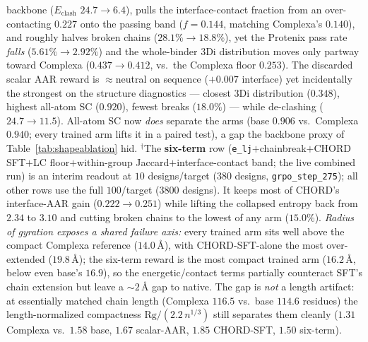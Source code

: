 \documentclass[11pt]{article}
\newcommand{\ttk}[1]{\texttt{\small #1}}
\begin{document}
\begin{table}[htbp]
{backbone ($E_{\mathrm{clash}}$ $24.7\!\to\!6.4$), pulls the interface-contact fraction from an
over-contacting $0.227$ onto the passing band ($f\!=\!0.144$, matching Complexa's $0.140$), and roughly
halves broken chains ($28.1\%\!\to\!18.8\%$),
yet the Protenix pass rate \emph{falls} ($5.61\%\!\to\!2.92\%$) and the whole-binder 3Di distribution
moves only partway toward Complexa ($0.437\!\to\!0.412$, vs.\ the Complexa floor $0.253$). The discarded
scalar AAR reward is $\approx$neutral on sequence ($+0.007$ interface) yet incidentally the strongest on
the structure diagnostics --- closest 3Di distribution ($0.348$), highest all-atom SC ($0.920$), fewest
breaks ($18.0\%$) --- while de-clashing ($24.7\!\to\!11.5$). All-atom SC now \emph{does} separate the
arms (base $0.906$ vs.\ Complexa $0.940$; every trained arm lifts it in a paired test), a gap the
backbone proxy of Table~\ref{tab:shapeablation} hid.
$^\dagger$The \textbf{six-term} row (\ttk{e\_lj}$+$chainbreak$+$CHORD SFT$+$LC floor$+$within-group
Jaccard$+$interface-contact band; the live combined run) is an interim readout at $10$ designs/target
($380$ designs, \ttk{grpo\_step\_275}); all other rows use the full $100$/target ($3800$ designs). It keeps
most of CHORD's interface-AAR gain ($0.222\!\to\!0.251$) while lifting the collapsed entropy back from
$2.34$ to $3.10$ and cutting broken chains to the lowest of any arm ($15.0\%$).
\emph{Radius of gyration exposes a shared failure axis:} every trained arm sits well above the compact
Complexa reference ($14.0$\,\AA), with CHORD-SFT-alone the most over-extended ($19.8$\,\AA); the six-term
reward is the most compact trained arm ($16.2$\,\AA, below even base's $16.9$), so the energetic/contact
terms partially counteract SFT's chain extension but leave a $\sim\!2$\,\AA{} gap to native. The gap is
\emph{not} a length artifact: at essentially matched chain length (Complexa $116.5$ vs.\ base $114.6$
residues) the length-normalized compactness $\mathrm{Rg}/(2.2\,n^{1/3})$ still separates them cleanly
($1.31$ Complexa vs.\ $1.58$ base, $1.67$ scalar-AAR, $1.85$ CHORD-SFT, $1.50$ six-term).}
\label{tab:seqablation}
\end{table}
\end{document}
